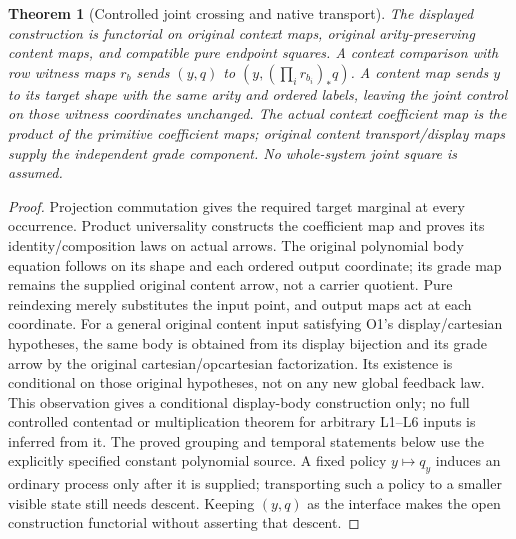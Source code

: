 \documentclass[11pt]{article}
\newtheorem{theorem}{Theorem}\newtheorem{proposition}[theorem]{Proposition}
\begin{document}
\begin{theorem}[Controlled joint crossing and native transport]
The displayed construction is functorial on original context maps, original arity-preserving content maps, and compatible pure endpoint squares. A context comparison with row witness maps $r_b$ sends $(y,q)$ to $(y,(\prod_i r_{b_i})_*q)$. A content map sends $y$ to its target shape with the same arity and ordered labels, leaving the joint control on those witness coordinates unchanged. The actual context coefficient map is the product of the primitive coefficient maps; original content transport/display maps supply the independent grade component. No whole-system joint square is assumed.
\end{theorem}
\begin{proof}
Projection commutation gives the required target marginal at every occurrence. Product universality constructs the coefficient map and proves its identity/composition laws on actual arrows. The original polynomial body equation follows on its shape and each ordered output coordinate; its grade map remains the supplied original content arrow, not a carrier quotient. Pure reindexing merely substitutes the input point, and output maps act at each coordinate. For a general original content input satisfying O1's display/cartesian hypotheses, the same body is obtained from its display bijection and its grade arrow by the original cartesian/opcartesian factorization. Its existence is conditional on those original hypotheses, not on any new global feedback law. This observation gives a conditional display-body construction only; no full controlled contentad or multiplication theorem for arbitrary L1--L6 inputs is inferred from it. The proved grouping and temporal statements below use the explicitly specified constant polynomial source. A fixed policy $y\mapsto q_y$ induces an ordinary process only after it is supplied; transporting such a policy to a smaller visible state still needs descent. Keeping $(y,q)$ as the interface makes the open construction functorial without asserting that descent.
\end{proof}
\end{document}
